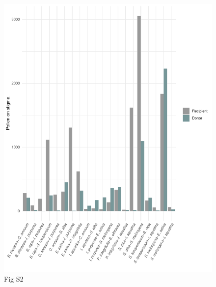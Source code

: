 \documentclass[
  12pt,
]{article}
\begin{document}
\begin{figure}
\centering
\includegraphics{Supp_Material_files/figure-latex/unnamed-chunk-4-1.pdf}
\caption{Fig S2}
\end{figure}

\newpage
\end{document}
